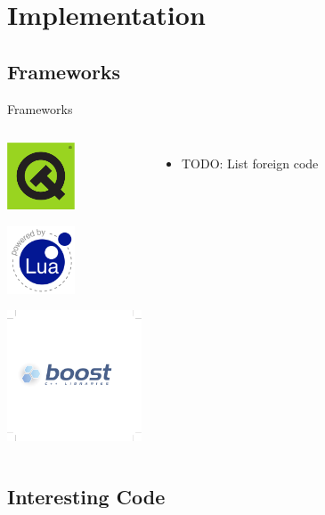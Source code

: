 \documentclass[12pt,ucs,hyperref={pdftext}]{beamer}
\newlength{\columnleft}
\newlength{\columnright}
\begin{document}
\section{Implementation}


\subsection{Frameworks}

\begin{frame}{Frameworks}
\begin{columns}

\column{\columnleft}

\begin{center}
\includegraphics[width=2cm]{media/logo/qt_original_r.pdf}

\bigskip

\includegraphics[width=2cm]{media/logo/lua-logo-label.pdf}

\bigskip

\includegraphics[width=4cm]{media/logo/boost-vec-white.pdf}
\end{center}

\column{\columnright}
\begin{itemize}%
\item TODO: List foreign code
\end{itemize}

\end{columns}
\end{frame}


\subsection{Interesting Code}
\end{document}
